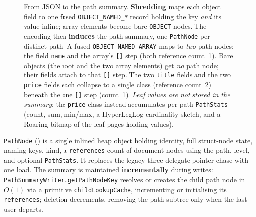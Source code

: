 \documentclass[11pt,a4paper,oneside]{report}
\theoremstyle{sirixthm}
\newcommand{\code}[1]{\texttt{#1}}
\begin{document}
\begin{figure}[t]
{%
}
\caption{From JSON to the path summary. \textbf{Shredding} maps each object field to one fused
\code{OBJECT\_NAMED\_*} record holding the key \emph{and} its value inline; array elements become bare
\code{OBJECT} nodes. The encoding then \textbf{induces} the path summary, one \code{PathNode} per
distinct path. A fused \code{OBJECT\_NAMED\_ARRAY} maps to \emph{two} path nodes: the field
\code{name} and the array's \code{[]} step (both reference count~1). Bare objects (the root and the two
array elements) get \emph{no} path node; their fields attach to that \code{[]} step. The two
\code{title} fields and the two \code{price} fields each
collapse to a single class (reference count~2) beneath the one \code{[]} step (count~1). \emph{Leaf
values are not stored in the summary}: the \code{price} class instead accumulates per-path
\code{PathStats} (count, sum, min/max, a HyperLogLog cardinality sketch, and a Roaring bitmap of the
leaf pages holding values).}
\label{fig:pathsummary}
\end{figure}

\code{PathNode} () is a single inlined heap object holding identity, full
struct-node state, naming keys, kind, a \code{references} count of document nodes using the
path, level, and optional \code{PathStats}. It replaces the legacy three-delegate pointer
chase with one load. The summary is maintained \textbf{incrementally} during writes:
\code{PathSummaryWriter.getPathNodeKey} resolves or creates the child path node in $O(1)$ via
a primitive \code{childLookupCache}, incrementing or initialising its \code{references};
deletion decrements, removing the path subtree only when the last user departs.
\end{document}
